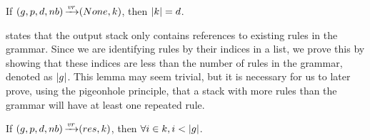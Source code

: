 \begin{lemma}%
    If $(g,p,d,nb) \operatorname{\xrightarrow{\mathit{vr}}} (None,k)$,
    then $|k| = d$.
    \label{lemma:stack-depth-lr-pattern}
\end{lemma}

 states
that the output stack
only contains references to
existing rules in the grammar.
Since we are identifying rules
by their indices in a list,
we prove this by showing that these indices
are less than the number of rules in the grammar,
denoted as $|g|$.
This lemma may seem trivial,
but it is necessary for us to later prove,
using the pigeonhole principle,
that a stack with more rules than the grammar
will have at least one repeated rule.

\begin{lemma}%
    If $(g,p,d,nb) \operatorname{\xrightarrow{\mathit{vr}}} (res,k)$,
    then $\forall i \in k, i < |g|$.
    \label{lemma:coherent-stack}
\end{lemma}





